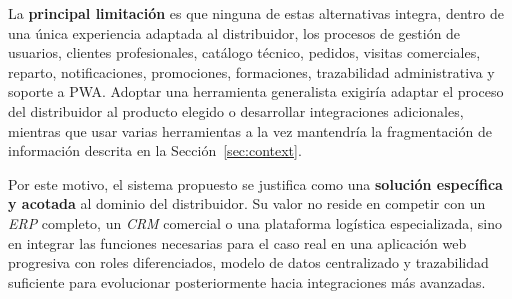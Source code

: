 La \textbf{principal limitación} es que ninguna de estas alternativas integra, dentro de una única experiencia adaptada al distribuidor, los procesos de gestión de usuarios, clientes profesionales, catálogo técnico, pedidos, visitas comerciales, reparto, notificaciones, promociones, formaciones, trazabilidad administrativa y soporte a PWA. Adoptar una herramienta generalista exigiría adaptar el proceso del distribuidor al producto elegido o desarrollar integraciones adicionales, mientras que usar varias herramientas a la vez mantendría la fragmentación de información descrita en la Sección~\ref{sec:context}.

Por este motivo, el sistema propuesto se justifica como una \textbf{solución específica y acotada} al dominio del distribuidor. Su valor no reside en competir con un \textit{ERP} completo, un \textit{CRM} comercial o una plataforma logística especializada, sino en integrar las funciones necesarias para el caso real en una aplicación web progresiva con roles diferenciados, modelo de datos centralizado y trazabilidad suficiente para evolucionar posteriormente hacia integraciones más avanzadas.
